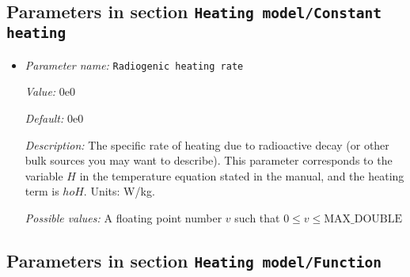 \subsection{Parameters in section \tt Heating model/Constant heating}
\label{parameters:Heating_20model/Constant_20heating}

\begin{itemize}
\item {\it Parameter name:} {\tt Radiogenic heating rate}
\label{parameters:Heating model/Constant heating/Radiogenic heating rate}
\label{parameters:Heating_20model/Constant_20heating/Radiogenic_20heating_20rate}


{\it Value:} 0e0


{\it Default:} 0e0


{\it Description:} The specific rate of heating due to radioactive decay (or other bulk sources you may want to describe). This parameter corresponds to the variable $H$ in the temperature equation stated in the manual, and the heating term is $
ho H$. Units: W/kg.


{\it Possible values:} A floating point number $v$ such that $0 \leq v \leq \text{MAX\_DOUBLE}$
\end{itemize}

\subsection{Parameters in section \tt Heating model/Function}
\label{parameters:Heating_20model/Function}

